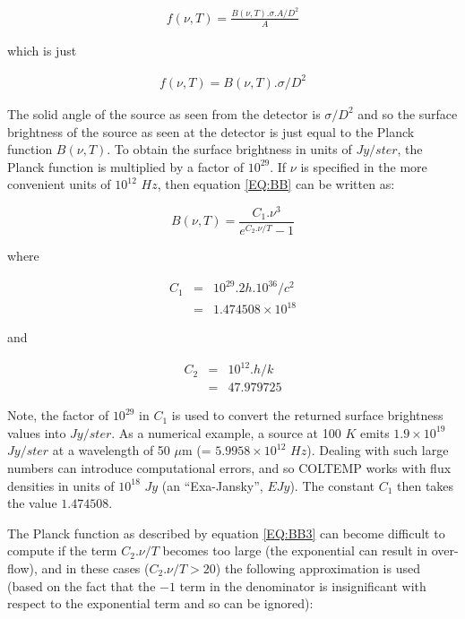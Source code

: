 \begin{eqnarray*}
f( \nu, T ) = \frac{B( \nu, T ).\sigma.A/D^{2}}{A}
\end{eqnarray*}

which is just

\begin{eqnarray*}
f( \nu, T ) = B( \nu, T ).\sigma/D^{2}
\end{eqnarray*}

The solid angle of the source as seen from the detector is $\sigma/D^{2}$ and so
the surface brightness of the source as seen at the detector is just equal to
the Planck function $B(\nu,T)$. To obtain the surface brightness in units of
$Jy/ster$, the Planck function is multiplied by a factor of $10^{29}$.
If $\nu$ is specified in the more convenient units of $10^{12}$ $Hz$, then
equation \ref{EQ:BB} can be written as:

\begin{equation}
\label{EQ:BB3}
B( \nu, T ) = \frac{C_{1}.\nu^{3}}{e^{C_{2}.\nu/T}-1}
\end{equation}

where

\begin{eqnarray*}
C_{1} & = & 10^{29}.2h.10^{36}/c^{2}\\
      & = & 1.474508 \times 10^{18}
\end{eqnarray*}

and

\begin{eqnarray*}
C_{2} & = & 10^{12}.h/k\\
      & = & 47.979725
\end{eqnarray*}

Note, the factor of $10^{29}$ in $C_{1}$ is used to convert the returned surface
brightness values into $Jy/ster$. As a numerical example, a source at 100 $K$
emits $1.9 \times 10^{19}$ $Jy/ster$ at a wavelength of 50 $\mu$m (= $5.9958
\times 10^{12}$ $Hz$). Dealing with such large numbers can introduce
computational errors, and so {\small COLTEMP} works with flux densities in units
of $10^{18}$ $Jy$ (an ``Exa-Jansky'', $EJy$). The constant $C_{1}$ then takes
the value $1.474508$.

The Planck function as described by equation \ref{EQ:BB3} can become difficult
to compute if the term $C_{2}.\nu/T$ becomes too large (the exponential can
result in over-flow), and in these cases ($C_{2}.\nu/T>20$) the following
approximation is used (based on the fact that the $-1$ term in the denominator
is insignificant with respect to the exponential term and so can be ignored):

